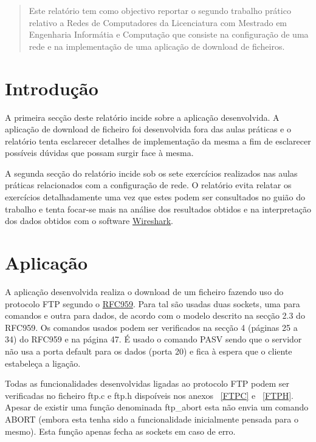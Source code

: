\documentclass[11pt,a4paper,reqno]{report}
\numberwithin{equation}{section}
\begin{document}



\begin{abstract}
	
Este relatório tem como objectivo reportar o segundo trabalho prático relativo a Redes de Computadores da Licenciatura com Mestrado em Engenharia Informátia e Computação que consiste na configuração de uma rede e na implementação de uma aplicação de download de ficheiros.


\end{abstract}

\tableofcontents

\chapter{Introdução}

A primeira secção deste relatório incide sobre a aplicação desenvolvida. A aplicação de download de ficheiro foi desenvolvida fora das aulas práticas e o relatório tenta esclarecer detalhes de implementação da mesma a fim de esclarecer possíveis dúvidas que possam surgir face à mesma.

A segunda secção do relatório incide sob os sete exercícios realizados nas aulas práticas relacionados com a configuração de rede. O relatório evita relatar os exercícios detalhadamente uma vez que estes podem ser consultados no guião do trabalho e tenta focar-se mais na análise dos resultados obtidos e na interpretação dos dados obtidos com o software \href{https://www.wireshark.org/}{Wireshark}.

 
	
\chapter{Aplicação}

A aplicação desenvolvida realiza o download de um ficheiro fazendo uso do protocolo FTP segundo o  \href{https://www.ietf.org/rfc/rfc959.txt}{RFC959}.
Para tal são usadas duas sockets, uma para comandos e outra para dados, de acordo com o modelo descrito na secção 2.3 do RFC959.
Os comandos usados podem ser verificados na secção 4 (páginas 25 a 34) do RFC959 e na página 47. É usado o comando PASV sendo que o servidor não usa a porta default para os dados (porta 20) e fica à espera que o cliente estabeleça a ligação.

Todas as funcionalidades desenvolvidas ligadas ao protocolo FTP podem ser verificadas no ficheiro ftp.c e ftp.h dispoíveis nos anexos ~\ref{FTPC} e ~\ref{FTPH}. Apesar de existir uma função denominada ftp\_abort esta não envia um comando ABORT (embora esta tenha sido a funcionalidade inicialmente pensada para o mesmo). Esta função apenas fecha as sockets em caso de erro.\\
\end{document}
